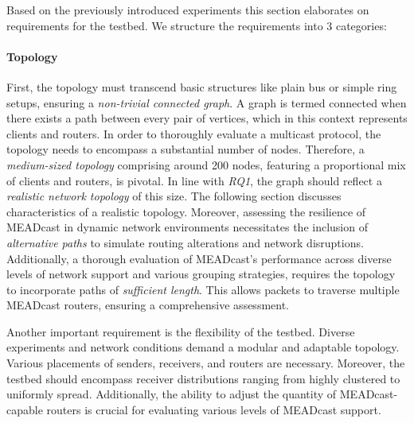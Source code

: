 
\label{sub:Requirements}
Based on the previously introduced experiments this section elaborates on 
    requirements for the testbed.
We structure the requirements into 3 categories:

\paragraph{Topology} %
\label{par:Topology}
First, the topology must transcend basic structures like plain bus or simple
    ring setups, ensuring a \textit{non-trivial connected graph}.
A graph is termed connected when there exists a path between every pair of
    vertices, which in this context represents clients and routers.
In order to thoroughly evaluate a multicast protocol, the topology needs to
    encompass a substantial number of nodes.
Therefore, a \textit{medium-sized topology} comprising around 200 nodes,
    featuring a proportional mix of clients and routers, is pivotal.
In line with \textit{RQ1}, the graph should reflect a \textit{realistic
    network topology} of this size.
The following section discusses characteristics of a realistic topology.
Moreover, assessing the resilience of MEADcast in dynamic network environments
    necessitates the inclusion of \textit{alternative paths} to simulate
    routing alterations and network disruptions.
Additionally, a thorough evaluation of MEADcast's performance across 
    diverse levels of network support and various grouping strategies, requires
    the topology to incorporate paths of \textit{sufficient length}.
This allows packets to traverse multiple MEADcast routers, ensuring a
    comprehensive assessment.

Another important requirement is the flexibility of the testbed.
Diverse experiments and network conditions demand a modular and adaptable
    topology.
Various placements of senders, receivers, and routers are necessary.
Moreover, the testbed should encompass receiver distributions ranging from
    highly clustered to uniformly spread.
Additionally, the ability to adjust the quantity of MEADcast-capable routers is
    crucial for evaluating various levels of MEADcast support.


